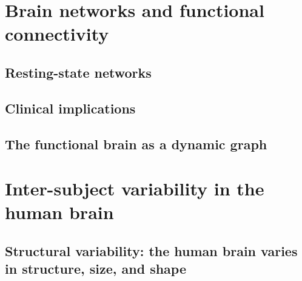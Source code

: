 

\chapter{Brain networks and functional connectivity}
\section{Resting-state networks}
\section{Clinical implications}
\section{The functional brain as a dynamic graph}

\chapter{Inter-subject variability in the human brain}
\section{Structural variability: the human brain varies in structure, size, and shape}
